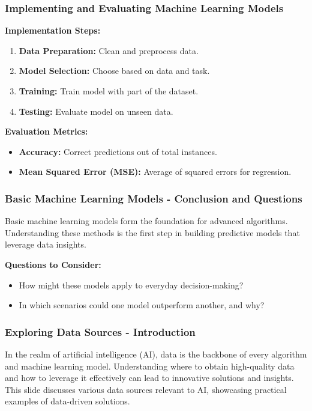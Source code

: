 \documentclass[aspectratio=169]{beamer}
\begin{document}
\begin{frame}[fragile]
    \frametitle{Implementing and Evaluating Machine Learning Models}
    \textbf{Implementation Steps:}
    \begin{enumerate}
        \item \textbf{Data Preparation:} Clean and preprocess data.
        \item \textbf{Model Selection:} Choose based on data and task.
        \item \textbf{Training:} Train model with part of the dataset.
        \item \textbf{Testing:} Evaluate model on unseen data.
    \end{enumerate}
    
    \textbf{Evaluation Metrics:}
    \begin{itemize}
        \item \textbf{Accuracy:} Correct predictions out of total instances.
        \item \textbf{Mean Squared Error (MSE):} Average of squared errors for regression.
    \end{itemize}
\end{frame}

\begin{frame}[fragile]
    \frametitle{Basic Machine Learning Models - Conclusion and Questions}
    Basic machine learning models form the foundation for advanced algorithms. Understanding these methods is the first step in building predictive models that leverage data insights.
    
    \textbf{Questions to Consider:}
    \begin{itemize}
        \item How might these models apply to everyday decision-making?
        \item In which scenarios could one model outperform another, and why?
    \end{itemize}
\end{frame}

\begin{frame}[fragile]
    \frametitle{Exploring Data Sources - Introduction}
    In the realm of artificial intelligence (AI), data is the backbone of every algorithm and machine learning model. Understanding where to obtain high-quality data and how to leverage it effectively can lead to innovative solutions and insights. This slide discusses various data sources relevant to AI, showcasing practical examples of data-driven solutions.
\end{frame}
\end{document}
